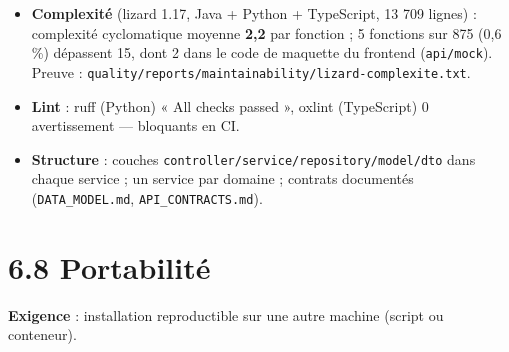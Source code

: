 \documentclass[
  11pt,
]{article}
\providecommand{\tightlist}{%
  \setlength{\itemsep}{0pt}\setlength{\parskip}{0pt}}
\begin{document}
\begin{itemize}
\tightlist
\item
  \textbf{Complexité} (lizard 1.17, Java + Python + TypeScript, 13 709
  lignes) : complexité cyclomatique moyenne \textbf{2,2} par fonction ;
  5 fonctions sur 875 (0,6 \%) dépassent 15, dont 2 dans le code de
  maquette du frontend (\texttt{api/mock}). Preuve :
  \texttt{quality/}\allowbreak{}\texttt{reports/}\allowbreak{}\texttt{maintainability/}\allowbreak{}\texttt{lizard-}\allowbreak{}\texttt{complexite.}\allowbreak{}\texttt{txt}.
\item
  \textbf{Lint} : ruff (Python) « All checks passed », oxlint
  (TypeScript) 0 avertissement --- bloquants en CI.
\item
  \textbf{Structure} : couches
  \texttt{controller/}\allowbreak{}\texttt{service/}\allowbreak{}\texttt{repository/}\allowbreak{}\texttt{model/}\allowbreak{}\texttt{dto}
  dans chaque service ; un service par domaine ; contrats documentés
  (\texttt{DATA\_MODEL.md}, \texttt{API\_CONTRACTS.md}).
\end{itemize}

\section{6.8 Portabilité}\label{68-portabilituxe9}

\textbf{Exigence} : installation reproductible sur une autre machine
(script ou conteneur).
\end{document}
